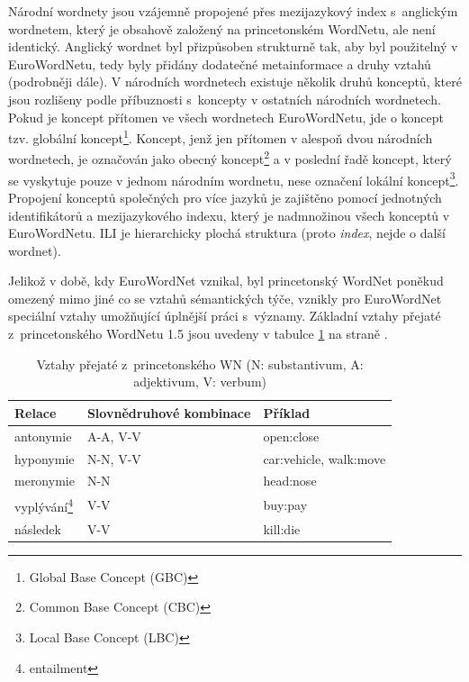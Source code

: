 \documentclass[a4paper, 11pt, oneside, showtrims]{book}
\newcommand\ex{\textsf}
\begin{document}
				Národní wordnety jsou vzájemně propojené přes mezijazykový index s~anglickým wordnetem, který je obsahově založený na princetonském WordNetu, ale není identický. Anglický wordnet byl přizpůsoben strukturně tak, aby byl použitelný v EuroWordNetu, tedy byly přidány dodatečné metainformace a druhy vztahů (podrobněji dále). V národních wordnetech existuje několik druhů konceptů, které jsou rozlišeny podle příbuznosti s~koncepty v ostatních národních wordnetech. Pokud je koncept přítomen ve všech wordnetech EuroWordNetu, jde o koncept tzv. globální koncept\footnote{Global Base Concept (GBC)}. Koncept, jenž jen přítomen v alespoň dvou národních wordnetech, je označován jako obecný koncept\footnote{Common Base Concept (CBC)} a v poslední řadě koncept, který se vyskytuje pouze v jednom národním wordnetu, nese označení lokální koncept\footnote{Local Base Concept (LBC)}. \parencite{gwa2013baseconcepts} Propojení konceptů společných pro více jazyků je zajištěno pomocí jednotných identifikátorů a mezijazykového indexu, který je nadmnožinou všech konceptů v EuroWordNetu. ILI je hierarchicky plochá struktura (proto \textit{index}, nejde o další  wordnet). \parencite{vossen1997eurowordnet}

				Jelikož v době, kdy EuroWordNet vznikal, byl princetonský WordNet poněkud omezený mimo jiné co se vztahů sémantických týče, vznikly pro EuroWordNet speciální vztahy umožňující úplnější práci s~významy. Základní vztahy přejaté z~princetonského WordNetu 1.5 jsou uvedeny v tabulce \ref{tab:wn-rels} na straně \pageref{tab:wn-rels}.

				\begin{table}[t]
					\centering
					\label{tab:wn-rels}
					\begin{tabular}{l l l}
					Relace                           & Slovnědruhové kombinace & Příklad                          \\\hline
					antonymie                        & A-A, V-V                & \ex{open:close}                  \\\hline
					hyponymie                        & N-N, V-V                & \ex{car:vehicle}, \ex{walk:move} \\\hline
					meronymie                        & N-N                     & \ex{head:nose}                   \\\hline
					vyplývání\footnote{entailment}   & V-V                     & \ex{buy:pay}                     \\\hline
					následek                         & V-V                     & \ex{kill:die}               
					\end{tabular}
					\caption{Vztahy přejaté z~princetonského WN (N: substantivum, A: adjektivum, V: verbum)}
				\end{table}
\end{document}
